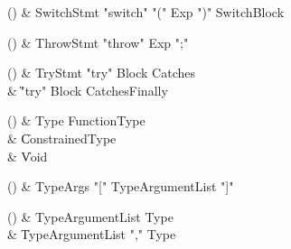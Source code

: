\begin{bbgrammarappendix}

() & SwitchStmt \label{prod:SwitchStmt}  \: \xcd"switch" \xcd"(" Exp \xcd")" SwitchBlock  \\


\end{bbgrammarappendix}

\begin{bbgrammarappendix}

() & ThrowStmt \label{prod:ThrowStmt}  \: \xcd"throw" Exp \xcd";"  \\


\end{bbgrammarappendix}

\begin{bbgrammarappendix}

() & TryStmt \label{prod:TryStmt}  \: \xcd"try" Block Catches  \\

 &    \| \xcd"try" Block Catches\opt Finally \\

\end{bbgrammarappendix}

\begin{bbgrammarappendix}

() & Type \label{prod:Type}  \: FunctionType  \\

 &    \| ConstrainedType \\
 &    \| Void \\

\end{bbgrammarappendix}

\begin{bbgrammarappendix}

() & TypeArgs \label{prod:TypeArgs}  \: \xcd"[" TypeArgumentList \xcd"]"  \\


\end{bbgrammarappendix}

\begin{bbgrammarappendix}

() & TypeArgumentList \label{prod:TypeArgumentList}  \: Type  \\

 &    \| TypeArgumentList \xcd"," Type \\

\end{bbgrammarappendix}

